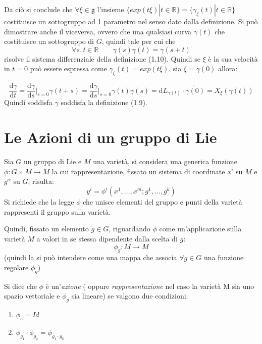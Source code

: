 \documentclass[11pt]{report}
\theoremstyle{plain}
\theoremstyle{definition}
\theoremstyle{remark}
\begin{document}
Da ciò si conclude che $\forall \xi \in \mathfrak{g}$ l'insieme $\{ exp(t\xi) | t \in \mathbb{R}\} = \{ \gamma_{\xi}(t)| t \in \mathbb{R}\}$ costituisce un sottogruppo ad 1 parametro nel senso dato dalla definizione.
Si può dimostrare anche il viceversa, ovvero che una qualsiasi curva $\gamma(t)$ che costituisce un sottogruppo di $G$, quindi tale per cui che $$\forall s,t \in \mathbb{R} \qquad \gamma(s)\gamma(t) = \gamma(s+t)$$ risolve il sistema differenziale della definizione (1.10). Quindi se $\xi$ è la sua velocità in $t=0$ può essere espressa come $\gamma_{\xi}(t) = exp (t \xi)$.
\proof
sia $\xi = \dot{\gamma}(0)$ allora:

\begin{displaymath}
\dfrac{\textrm{d} \gamma}{\textrm{d}t} = \dfrac{\textrm{d} \gamma}{\textrm{d}s}\bigr|_{s=0} \gamma(t+s) = \dfrac{\textrm{d} \gamma}{\textrm{d}s}\bigr|_{s=0} \gamma(t) \gamma(s) = \textrm{d}L_{\gamma(t)} \cdot \dot{\gamma(0)} = X_{\xi}(\gamma(t)) 
\end{displaymath}
Quindi soddisfa $\gamma$ soddisfa la definizione (1.9).
\endproof


\section{Le Azioni di un gruppo di Lie}
 \label{adg}
 Sia $G$ un gruppo di Lie e $M$ una varietà, si considera una generica funzione $\phi : G \times M \rightarrow M $ la cui rappresentazione, fissato un sistema di coordinate $x^{i}$ su $M$ e $g^{\alpha}$ su $G$, risulta:
$$ y^{i} = \phi^{i} ( x^{1}, \ldots, x^{m} ; g^{1}, \ldots, g^{k})$$
Si richiede che la legge $\phi$ che unisce elementi del gruppo e punti della varietà rappresenti il gruppo sulla varietà.

Quindi, fissato un elemento $g \in G$, riguardando $\phi$ come un'applicazione sulla varietà $M$ a valori in se stessa dipendente dalla scelta di $g$: $$\phi_{g} :M \rightarrow M$$
(quindi la si può intendere come una mappa che associa $\forall g \in G$ una funzione regolare $\phi_{g}$)

Si dice che $\phi$ è un'\emph{azione} ( oppure \emph{rappresentazione} nel caso la varietà M sia uno spazio vettoriale e $\phi_{g}$ sia lineare) se valgono due condizioni:

\begin{enumerate}
   \item $\phi_{e} = Id$
   \item $\phi_{g_{1}} \cdot \phi_{g_{2}} = \phi_{g_{1}\cdot g_{2}}$
\end{enumerate}
\end{document}
